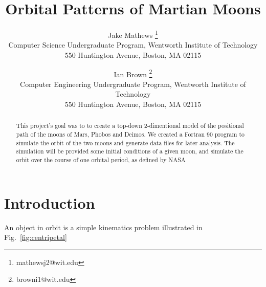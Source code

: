 \documentclass[11pt]{article}
\begin{document}
\title{\textbf{Orbital Patterns of Martian Moons}}

\author{Jake Mathews
\thanks{mathewsj2@wit.edu}\\
Computer Science Undergraduate Program, Wentworth Institute of Technology\\
550 Huntington Avenue, Boston, MA 02115\\
\and Ian Brown
\thanks{browni1@wit.edu}\\
Computer Engineering Undergraduate Program, Wentworth Institute of Technology\\
550 Huntington Avenue, Boston, MA 02115}

\maketitle

\begin{abstract}

This project's goal was to to create a top-down 2-dimentional model
of the positional path of the moons of Mars, Phobos and Deimos.
We created a Fortran 90 program to simulate the orbit of the two moons
and generate data files for later analysis.
The simulation will be provided some initial conditions of a given moon,
and simulate the orbit over the course of one orbital period, as defined
by NASA~\cite{nasa}

\end{abstract}




\section{Introduction}
An object in orbit is a simple kinematics problem illustrated in Fig.~\ref{fig:centripetal}
\end{document}
